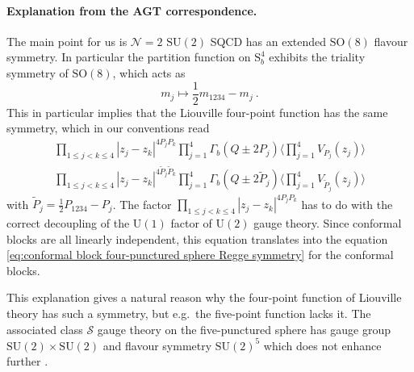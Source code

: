 \documentclass[12pt,a4paper]{article}
\newcommand{\be}{\begin{equation}}
\newcommand{\ee}{\end{equation}}
\begin{document}
\paragraph{Explanation from the AGT correspondence.} The main point for us is $\mathcal{N}=2$ $\mathrm{SU}(2)$ SQCD has an extended $\mathrm{SO}(8)$ flavour symmetry. In particular the partition function on $\mathrm{S}_b^4$ exhibits the triality symmetry of $\mathrm{SO}(8)$, which acts as
\be 
m_j \mapsto \frac{1}{2} m_{1234}-m_j\ .
\ee
This in particular implies that the Liouville four-point function has the same symmetry, which in our conventions read
\begin{multline}
    \prod_{1\le j<k \le 4}|z_j-z_k|^{4P_jP_k} \prod_{j=1}^4 \Gamma_b(Q \pm 2 P_j) \Big \langle \prod_{j=1}^4 V_{P_j}(z_j) \Big \rangle  \\
    \prod_{1\le j<k \le 4}|z_j-z_k|^{4\tilde{P}_j\tilde{P}_k} \prod_{j=1}^4 \Gamma_b(Q \pm 2 \tilde{P}_j) \Big \langle \prod_{j=1}^4 V_{\tilde{P}_j}(z_j) \Big \rangle   
\end{multline}
with $\tilde{P}_j=\frac{1}{2} P_{1234}-P_j$. 
The factor $\prod_{1\le j<k \le 4}|z_j-z_k|^{4P_jP_k}$ has to do with the correct decoupling of the $\mathrm{U}(1)$ factor of $\mathrm{U}(2)$ gauge theory.
Since conformal blocks are all linearly independent, this equation translates into the equation \eqref{eq:conformal block four-punctured sphere Regge symmetry} for the conformal blocks.

This explanation gives a natural reason why the four-point function of Liouville theory has such a symmetry, but e.g.\ the five-point function lacks it. The associated class $\mathcal{S}$ gauge theory on the five-punctured sphere has gauge group $\mathrm{SU}(2) \times \mathrm{SU}(2)$ and flavour symmetry $\mathrm{SU}(2)^5$ which does not enhance further \cite{Gaiotto:2009we}.
\end{document}
